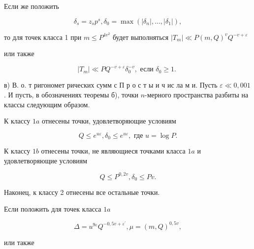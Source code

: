 \documentclass[10pt]{article}
\begin{document}
Если же положить



\[

\delta_{s}=z_{s} p^{s}, \delta_{0}=\max \left(\left|\delta_{n}\right|, \ldots,\left|\delta_{1}\right|\right),

\]



то для точек класса 1 при $m \leqslant P^{4 v^{2}}$ будет выполняться $\left|T_{m}\right| \ll P(m, Q)^{v} Q^{-v+\varepsilon}$



или также



\[

\left|T_{m}\right| \ll P Q^{-v+\varepsilon} \delta_{0}^{-v}, \text { если } \delta_{0} \geqslant 1 \text {. }

\]



в) В. о. т ригономет рических сумм с П р о с т ы и ч ис ла м и. Пусть $\varepsilon \ll 0,001$. И пусть, в обозначениях теоремы б), точки $n$-мерного пространства разбиты на классы следующим образом.



К классу $1 a$ отнесены точки, удовлетворяющие условиям



\[

Q \leqslant e^{u \varepsilon}, \delta_{0} \leqslant e^{u \varepsilon}, \text { где } u=\log P .

\]



К классу $1 b$ отнесены точки, не являющиеся точками класса $1 a$ и удовлетворяющие условиям



\[

Q \leqslant P^{0,2 v}, \delta_{0} \leqslant P v .

\]



Наконец, к классу 2 отнесены все остальные точки.



Если положить для точек класса $1 a$



\[

\Delta=u^{9 \varepsilon} Q^{-0,5 v+\varepsilon^{\prime}}, \mu=(m, Q)^{0,5 v},

\]



или также
\end{document}
